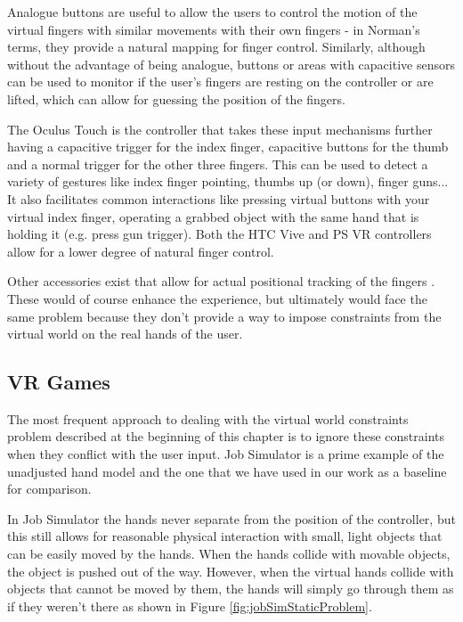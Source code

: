 Analogue buttons are useful to allow the users to control the motion of the virtual fingers with similar movements with their own fingers - in Norman's terms, they provide a natural mapping \parencite{Norman} for finger control. Similarly, although without the advantage of being analogue, buttons or areas with capacitive sensors can be used to monitor if the user's fingers are resting on the controller or are lifted, which can allow for guessing the position of the fingers. 

The Oculus Touch is the controller that takes these input mechanisms further having a capacitive trigger for the index finger, capacitive buttons for the thumb and a normal trigger for the other three fingers. This can be used to detect a variety of gestures like index finger pointing, thumbs up (or down), finger guns... It also facilitates common interactions like pressing virtual buttons with your virtual index finger, operating a grabbed object with the same hand that is holding it (e.g. press gun trigger). Both the HTC Vive and PS VR controllers allow for a lower degree of natural finger control.

Other accessories exist that allow for actual positional tracking of the fingers \parencite{ManusVR2016}. These would of course enhance the experience, but ultimately would face the same problem because they don't provide a way to impose constraints from the virtual world on the real hands of the user.

\subsection{VR Games}
\label{subsec:vrGames}

The most frequent approach to dealing with the virtual world constraints problem described at the beginning of this chapter is to ignore these constraints when they conflict with the user input. Job Simulator is a prime example of the unadjusted hand model and the one that we have used in our work as a baseline for comparison.

In Job Simulator the hands never separate from the position of the controller, but this still allows for reasonable physical interaction with small, light objects that can be easily moved by the hands. When the hands collide with movable objects, the object is pushed out of the way. However, when the virtual hands collide with objects that cannot be moved by them, the hands will simply go through them as if they weren't there as shown in Figure \ref{fig:jobSimStaticProblem}.

